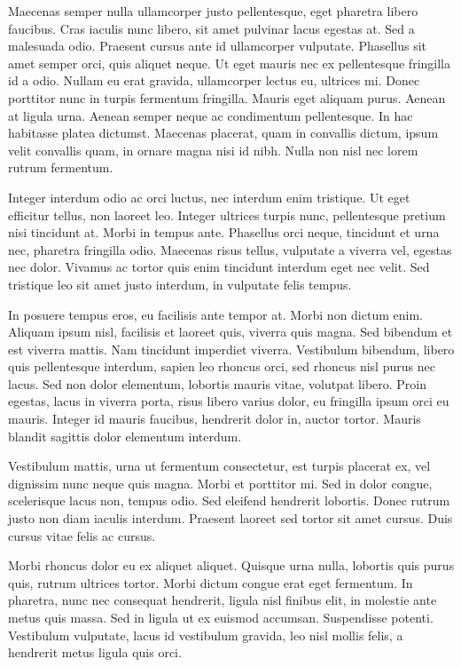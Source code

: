 \documentclass{llncs}
\begin{document}
Maecenas semper nulla ullamcorper justo pellentesque, eget pharetra libero faucibus. Cras iaculis nunc libero, sit amet pulvinar lacus egestas at. Sed a malesuada odio. Praesent cursus ante id ullamcorper vulputate. Phasellus sit amet semper orci, quis aliquet neque. Ut eget mauris nec ex pellentesque fringilla id a odio. Nullam eu erat gravida, ullamcorper lectus eu, ultrices mi. Donec porttitor nunc in turpis fermentum fringilla. Mauris eget aliquam purus. Aenean at ligula urna. Aenean semper neque ac condimentum pellentesque. In hac habitasse platea dictumst. Maecenas placerat, quam in convallis dictum, ipsum velit convallis quam, in ornare magna nisi id nibh. Nulla non nisl nec lorem rutrum fermentum.

Integer interdum odio ac orci luctus, nec interdum enim tristique. Ut eget efficitur tellus, non laoreet leo. Integer ultrices turpis nunc, pellentesque pretium nisi tincidunt at. Morbi in tempus ante. Phasellus orci neque, tincidunt et urna nec, pharetra fringilla odio. Maecenas risus tellus, vulputate a viverra vel, egestas nec dolor. Vivamus ac tortor quis enim tincidunt interdum eget nec velit. Sed tristique leo sit amet justo interdum, in vulputate felis tempus.

In posuere tempus eros, eu facilisis ante tempor at. Morbi non dictum enim. Aliquam ipsum nisl, facilisis et laoreet quis, viverra quis magna. Sed bibendum et est viverra mattis. Nam tincidunt imperdiet viverra. Vestibulum bibendum, libero quis pellentesque interdum, sapien leo rhoncus orci, sed rhoncus nisl purus nec lacus. Sed non dolor elementum, lobortis mauris vitae, volutpat libero. Proin egestas, lacus in viverra porta, risus libero varius dolor, eu fringilla ipsum orci eu mauris. Integer id mauris faucibus, hendrerit dolor in, auctor tortor. Mauris blandit sagittis dolor elementum interdum.

Vestibulum mattis, urna ut fermentum consectetur, est turpis placerat ex, vel dignissim nunc neque quis magna. Morbi et porttitor mi. Sed in dolor congue, scelerisque lacus non, tempus odio. Sed eleifend hendrerit lobortis. Donec rutrum justo non diam iaculis interdum. Praesent laoreet sed tortor sit amet cursus. Duis cursus vitae felis ac cursus.

Morbi rhoncus dolor eu ex aliquet aliquet. Quisque urna nulla, lobortis quis purus quis, rutrum ultrices tortor. Morbi dictum congue erat eget fermentum. In pharetra, nunc nec consequat hendrerit, ligula nisl finibus elit, in molestie ante metus quis massa. Sed in ligula ut ex euismod accumsan. Suspendisse potenti. Vestibulum vulputate, lacus id vestibulum gravida, leo nisl mollis felis, a hendrerit metus ligula quis orci. 



\end{document}
